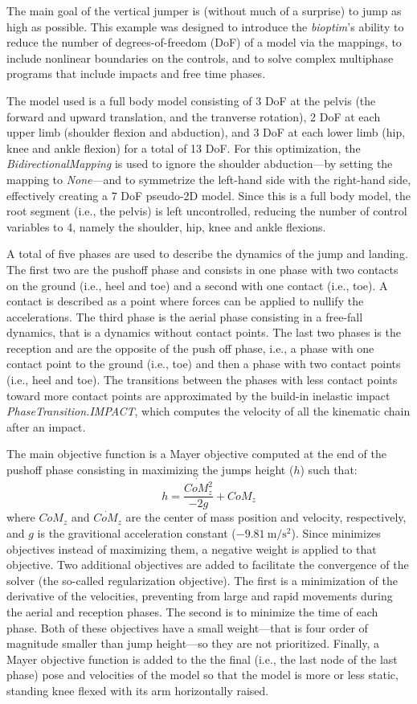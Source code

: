 The main goal of the vertical jumper is (without much of a surprise) to jump as high as possible.
This example was designed to introduce the \emph{bioptim}'s ability to reduce the number of degrees-of-freedom (DoF) of a model via the mappings, to include nonlinear boundaries on the controls, and to solve complex multiphase programs that include impacts and free time phases.

The model used is a full body model consisting of 3 DoF at the pelvis (the forward and upward translation, and the tranverse rotation), 2 DoF at each upper limb (shoulder flexion and abduction), and 3 DoF at each lower limb (hip, knee and ankle flexion) for a total of 13 DoF.
For this optimization, the \emph{BidirectionalMapping} is used to ignore the shoulder abduction---by setting the mapping to \emph{None}---and to symmetrize the left-hand side with the right-hand side, effectively creating a 7 DoF pseudo-2D model. 
Since this is a full body model, the root segment (i.e., the pelvis) is left uncontrolled, reducing the number of control variables to 4, namely the shoulder, hip, knee and ankle flexions. 

A total of five phases are used to describe the dynamics of the jump and landing. 
The first two are the pushoff phase and consists in one phase with two contacts on the ground (i.e., heel and toe) and a second with one contact (i.e., toe). 
A contact is described as a point where forces can be applied to nullify the accelerations. 
The third phase is the aerial phase consisting in a free-fall dynamics, that is a dynamics without contact points.
The last two phases is the reception and are the opposite of the push off phase, i.e., a phase with one contact point to the ground (i.e., toe) and then a phase with two contact points (i.e., heel and toe).
The transitions between the phases with less contact points toward more contact points are approximated by the build-in inelastic impact \emph{PhaseTransition.IMPACT}, which computes the velocity of all the kinematic chain after an impact.

The main objective function is a Mayer objective computed at the end of the pushoff phase consisting in maximizing the jumps height ($h$) such that:
\[
h = \frac{\dot{CoM_z^2}}{-2 g} + CoM_z
\]
where $CoM_z$ and $\dot{CoM_z}$ are the center of mass position and velocity, respectively, and $g$ is the gravitional acceleration constant ($\SI{-9.81}{\meter/\second^2}$).
Since \bioptim minimizes objectives instead of maximizing them, a negative weight is applied to that objective. 
Two additional objectives are added to facilitate the convergence of the solver (the so-called regularization objective).
The first is a minimization of the derivative of the velocities, preventing from large and rapid movements during the aerial and reception phases. 
The second is to minimize the time of each phase.
Both of these objectives have a small weight---that is four order of magnitude smaller than jump height---so they are not prioritized.
Finally, a Mayer objective function is added to the the final (i.e., the last node of the last phase) pose and velocities of the model so that the model is more or less static, standing knee flexed with its arm horizontally raised. 

